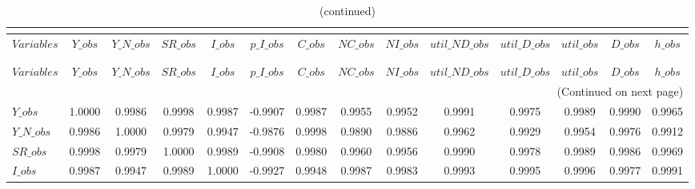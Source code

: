  
\begin{center}
\begin{longtable}{lccccccccccccc} 
\caption{MATRIX OF CORRELATIONS}\\
 \label{Table:th_corr_matrix}\\
\toprule 
$Variables      $	 & 	 $          Y\_obs$	 & 	 $      Y\_N\_obs$	 & 	 $         SR\_obs$	 & 	 $          I\_obs$	 & 	 $      p\_I\_obs$	 & 	 $          C\_obs$	 & 	 $         NC\_obs$	 & 	 $         NI\_obs$	 & 	 $  util\_ND\_obs$	 & 	 $   util\_D\_obs$	 & 	 $       util\_obs$	 & 	 $          D\_obs$	 & 	 $          h\_obs$\\
\midrule \endfirsthead 
\caption{(continued)}\\
 \toprule \\ 
$Variables      $	 & 	 $          Y\_obs$	 & 	 $      Y\_N\_obs$	 & 	 $         SR\_obs$	 & 	 $          I\_obs$	 & 	 $      p\_I\_obs$	 & 	 $          C\_obs$	 & 	 $         NC\_obs$	 & 	 $         NI\_obs$	 & 	 $  util\_ND\_obs$	 & 	 $   util\_D\_obs$	 & 	 $       util\_obs$	 & 	 $          D\_obs$	 & 	 $          h\_obs$\\
\midrule \endhead 
\midrule \multicolumn{14}{r}{(Continued on next page)} \\ \bottomrule \endfoot 
\bottomrule \endlastfoot 
$Y\_obs         $	 & 	           1.0000	 & 	           0.9986	 & 	           0.9998	 & 	           0.9987	 & 	          -0.9907	 & 	           0.9987	 & 	           0.9955	 & 	           0.9952	 & 	           0.9991	 & 	           0.9975	 & 	           0.9989	 & 	           0.9990	 & 	           0.9965 \\ 
$Y\_N\_obs      $	 & 	           0.9986	 & 	           1.0000	 & 	           0.9979	 & 	           0.9947	 & 	          -0.9876	 & 	           0.9998	 & 	           0.9890	 & 	           0.9886	 & 	           0.9962	 & 	           0.9929	 & 	           0.9954	 & 	           0.9976	 & 	           0.9912 \\ 
$SR\_obs        $	 & 	           0.9998	 & 	           0.9979	 & 	           1.0000	 & 	           0.9989	 & 	          -0.9908	 & 	           0.9980	 & 	           0.9960	 & 	           0.9956	 & 	           0.9990	 & 	           0.9978	 & 	           0.9989	 & 	           0.9986	 & 	           0.9969 \\ 
$I\_obs         $	 & 	           0.9987	 & 	           0.9947	 & 	           0.9989	 & 	           1.0000	 & 	          -0.9927	 & 	           0.9948	 & 	           0.9987	 & 	           0.9983	 & 	           0.9993	 & 	           0.9995	 & 	           0.9996	 & 	           0.9977	 & 	           0.9991 \\ 

\end{longtable}
\end{center}
